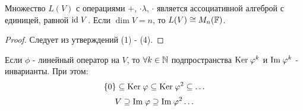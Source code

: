     \begin{theorem}
        Множество $L(V)$ с операциями $+$, $\cdot\lambda $, $\cdot$ является ассоциативной алгеброй с единицей, равной $\id \tab[0.1cm]V$.
        Если $\dim V = n$, то $L(V) \cong M_{n}(\F)$.
    \end{theorem}
    \begin{proof}
        Следует из утверждений (1) - (4).
    \end{proof}
    \begin{subtheorem}
        Если $\phi$ - линейный оператор на $V$, то $\forall k \in \N$ подпространства $\text{Ker} \hspace{0.09cm} \phi^k$ и $\text{Im} \hspace{0.09cm} \phi^k$ - инварианты. При этом: 
        $$\{0\} \subseteq \text{Ker} \hspace{0.09cm} \phi \subseteq \text{Ker} \hspace{0.09cm} \phi^2 \subseteq \ldots$$
        $$V \supseteq \text{Im} \hspace{0.09cm} \phi \supseteq \text{Im} \hspace{0.09cm} \phi^2\ldots$$
    \end{subtheorem}

    
     

